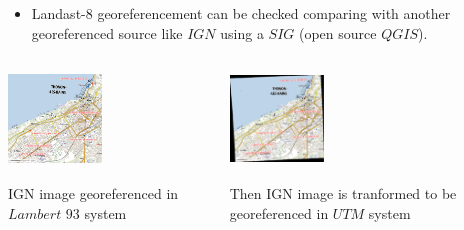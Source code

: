\documentclass[c]{beamer}
\begin{document}
\begin{frame}
\begin{itemize}
 \item Landast-8 georeferencement can be checked comparing with another georeferenced source like $IGN$ using a $SIG$ (open source $QGIS$).
\end{itemize}

\begin{columns}[t]
\begin{column}{0.30\textwidth}
\begin{overlayarea}{\linewidth}{3cm}
  \centering\vfill
  \includegraphics[height=2.5cm,width=2.5cm]{images/georeferencing/ign-points-Thonon.png}
\end{overlayarea}
\begin{overlayarea}{\linewidth}{2cm}
  \centering
  \scriptsize IGN image georeferenced in $Lambert$ $93$ system\par
\end{overlayarea}
\end{column}
\begin{column}{0.30\textwidth}
\begin{overlayarea}{\linewidth}{3cm}
  \centering\vfill
  \includegraphics[height=2.5cm,width=2.5cm]{images/georeferencing/qgis-resultat.png}
\end{overlayarea}
\begin{overlayarea}{\linewidth}{2cm}
  \centering
  \scriptsize Then IGN image is tranformed to be georeferenced in $UTM$ system\par
\end{overlayarea}

\end{column}
\end{columns}
\end{frame}
\end{document}
